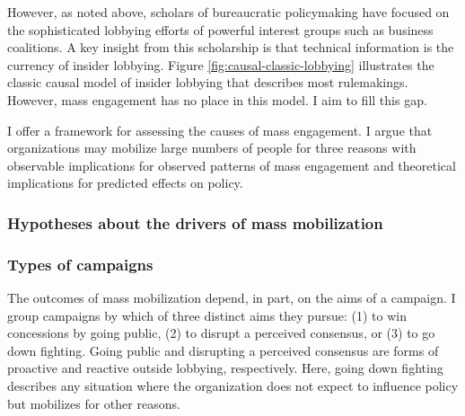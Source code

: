 However, as noted above, scholars of bureaucratic policymaking have focused on the sophisticated lobbying efforts of powerful interest groups such as business coalitions. A key insight from this scholarship is that technical information is the currency of insider lobbying. Figure \ref{fig:causal-classic-lobbying} illustrates the classic causal model of insider lobbying that describes most rulemakings. However, mass engagement has no place in this model. I aim to fill this gap.





I offer a framework for assessing the causes of mass engagement. %
I argue that organizations may mobilize large numbers of people for three reasons with observable implications for observed patterns of mass engagement and theoretical implications for predicted effects on policy. 

\subsubsection{Hypotheses about the drivers of mass mobilization}

\subsubsection{Types of campaigns} The outcomes of mass mobilization depend, in part, on the aims of a campaign. I group campaigns by which of three distinct aims they pursue: (1) to win concessions by going public, (2) to disrupt a perceived consensus, or (3) to go down fighting. Going public and disrupting a perceived consensus are forms of proactive and reactive outside lobbying, respectively. Here, going down fighting describes any situation where the organization does not expect to influence policy but mobilizes for other reasons. 

